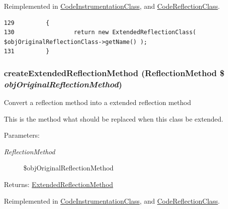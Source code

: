 Reimplemented in \hyperlink{class_code_instrumentation_class_6b56ec198bc6a5b5a72076e4e7c19e29}{CodeInstrumentationClass}, and \hyperlink{class_code_reflection_class_6b56ec198bc6a5b5a72076e4e7c19e29}{CodeReflectionClass}.

\begin{Code}\begin{verbatim}129         {
130                 return new ExtendedReflectionClass( $objOriginalReflectionClass->getName() );
131         }
\end{verbatim}
\end{Code}


\hypertarget{class_extended_reflection_class_ec7c1d4b204b6e3a6291d3b867afb688}{
\subsubsection[{createExtendedReflectionMethod}]{\setlength{\rightskip}{0pt plus 5cm}createExtendedReflectionMethod (ReflectionMethod \$ {\em objOriginalReflectionMethod})}}
\label{class_extended_reflection_class_ec7c1d4b204b6e3a6291d3b867afb688}


Convert a reflection method into a extended reflection method

This is the method what should be replaced when this class be extended.

\begin{Desc}
\item[Parameters:]
\begin{description}
\item[{\em ReflectionMethod}]\$objOriginalReflectionMethod \end{description}
\end{Desc}
\begin{Desc}
\item[Returns:]\hyperlink{class_extended_reflection_method}{ExtendedReflectionMethod} \end{Desc}


Reimplemented in \hyperlink{class_code_instrumentation_class_ec7c1d4b204b6e3a6291d3b867afb688}{CodeInstrumentationClass}, and \hyperlink{class_code_reflection_class_ec7c1d4b204b6e3a6291d3b867afb688}{CodeReflectionClass}.

